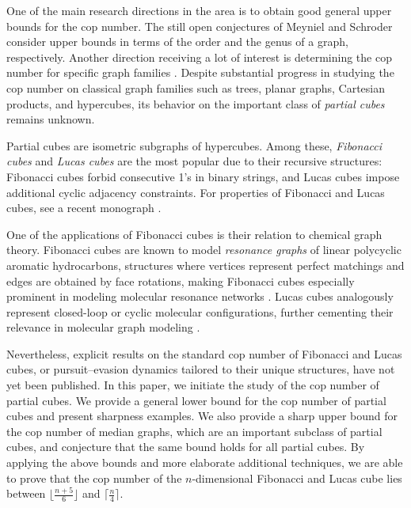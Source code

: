 \documentclass[11pt]{article}
\begin{document}
One of the main research directions in the area is to obtain good general upper bounds for the cop number. The still open conjectures of Meyniel \cite{maamoun-1987} and Schroder \cite{schroeder-2001} consider upper bounds in terms of the order and the genus of a graph, respectively. Another direction receiving a lot of interest is determining the cop number for specific graph families \cite{MR1623932, MR3647488, MR3997485, MR4313187, MR4285899, MR4520060, MR4708898}. Despite substantial progress in studying the cop number on classical graph families such as trees, planar graphs, Cartesian products, and hypercubes, its behavior on the important class of \emph{partial cubes} remains unknown. 

Partial cubes are isometric subgraphs of hypercubes. Among these, \emph{Fibonacci cubes} and \emph{Lucas cubes} are the most popular due to their recursive structures: Fibonacci cubes forbid consecutive 1's in binary strings, and Lucas cubes impose additional cyclic adjacency constraints. For properties of Fibonacci and Lucas cubes, see a recent monograph \cite{book}.

One of the applications of Fibonacci cubes is their relation to chemical graph theory. Fibonacci cubes are known to model \emph{resonance graphs} of linear polycyclic aromatic hydrocarbons, structures where vertices represent perfect matchings and edges are obtained by face rotations, making Fibonacci cubes especially prominent in modeling molecular resonance networks \cite{kz-05}. 
Lucas cubes analogously represent closed-loop or cyclic molecular configurations, further cementing their relevance in molecular graph modeling \cite{zigert-2013, yao-2015}.

Nevertheless, explicit results on the standard cop number of Fibonacci and Lucas cubes, or pursuit--evasion dynamics tailored to their unique structures, have not yet been published. In this paper, we initiate the study of the cop number of partial cubes. We provide a general lower bound for the cop number of partial cubes and present sharpness examples. We also provide a sharp upper bound for the cop number of median graphs, which are an important subclass of partial cubes, and conjecture that the same bound holds for all partial cubes. By applying the above bounds and more elaborate additional techniques, we are able to prove that the cop number of the $n$-dimensional Fibonacci and Lucas cube lies between $\lfloor \frac{n+5}{6} \rfloor$ and $\lceil \frac{n}{4} \rceil$.

\end{document}
